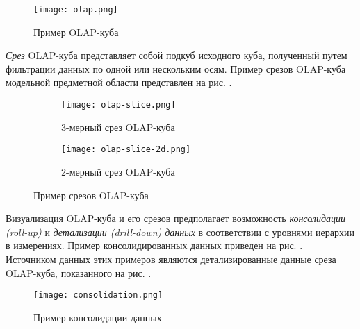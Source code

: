 \begin{figure}[h]
  \centering
  \texttt{[image: olap.png]}
  \caption{Пример OLAP-куба}
  \label{olap}
\end{figure}

\textit{Срез} OLAP-куба представляет собой подкуб исходного куба, полученный путем фильтрации данных по одной или нескольким осям. Пример срезов OLAP-куба модельной предметной области представлен на рис. .

\begin{figure}[h]
  \centering
  \begin{subfigure}[h]{\textwidth}
    \texttt{[image: olap-slice.png]}
    \caption{3-мерный срез OLAP-куба}
    \label{olap-slice-3d}
  \end{subfigure} \par
  \begin{subfigure}[h]{\textwidth}
    \texttt{[image: olap-slice-2d.png]}
    \caption{2-мерный срез OLAP-куба}
    \label{olap-slice-2d}
  \end{subfigure}
  \caption{Пример срезов OLAP-куба}
  \label{olap-slice}
\end{figure}

Визуализация OLAP-куба и его срезов предполагает возможность \textit{консолидации (roll-up)} и \textit{детализации (drill-down) данных} в соответствии с уровнями иерархии в измерениях. Пример консолидированных данных приведен на рис. . Источником данных этих примеров являются детализированные данные среза OLAP-куба, показанного на рис. .

\begin{figure}[h]
  \centering
  \texttt{[image: consolidation.png]}
  \caption{Пример консолидации данных}
  \label{consolidation}
\end{figure}


